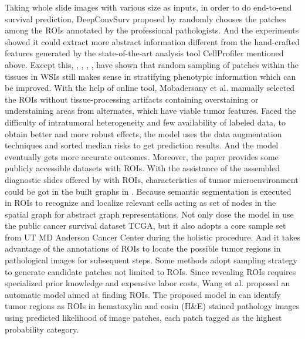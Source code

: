 \documentclass[journal,twoside,web]{ieeecolor}
\begin{document}
Taking whole slide images with various size as inputs, in order to do end-to-end survival prediction, DeepConvSurv proposed by \cite{zhu2016deep} randomly chooses the patches among the ROIs annotated by the professional pathologists.
And the experiments showed it could extract more abstract information different from the hand-crafted features generated by the state-of-the-art analysis tool CellProfiler mentioned above.
Except this, \cite{zhu2017wsisa}, \cite{di2020ranking}, \cite{yao2020whole}, \cite{abbet2020divide}, \cite{yao2019deep} have shown that random sampling of patches within the tissues in WSIs still makes sense in stratifying phenotypic information which can be improved.
With the help of online tool, Mobadersany et al.\cite{mobadersany2018predicting} manually selected the ROIs without tissue-processing artifacts containing overstaining or understaining areas from alternates, which have viable tumor features. 
Faced the difficulty of intratumoral heterogeneity and few availability of labeled data, to obtain better and more robust effects, the model uses the data augmentation techniques and sorted median risks to get prediction results.
And the model eventually gets more accurate outcomes. 
Moreover, the paper provides some publicly accessible datasets with ROIs.
With the assistance of the assembled diagnostic slides offered by \cite{mobadersany2018predicting} with ROIs, characteristics of tumor microenvironment could be got in the built graphs in \cite{chen2020pathomic}.
Because semantic segmentation is executed in ROIs to recognize and localize relevant cells acting as set of nodes in the spatial graph for abstract graph representations.
Not only dose the model in \cite{yao2017deep} use the public cancer survival dataset TCGA, but it also adopts a core sample set from UT MD Anderson Cancer Center during the holistic procedure.
And it takes advantage of the annotations of ROIs to locate the possible tumor regions in pathological images for subsequent steps.
Some methods adopt sampling strategy to generate candidate patches not limited to ROIs.
Since revealing ROIs requires specialized prior knowledge and expensive labor costs, Wang et al. proposed an automatic model aimed at finding ROIs.
The proposed model in \cite{wang2018comprehensive} can identify tumor regions as ROIs in hematoxylin and eosin (H\&E) stained pathology images using predicted likelihood of image patches, each patch tagged as the highest probability category. 
\end{document}
